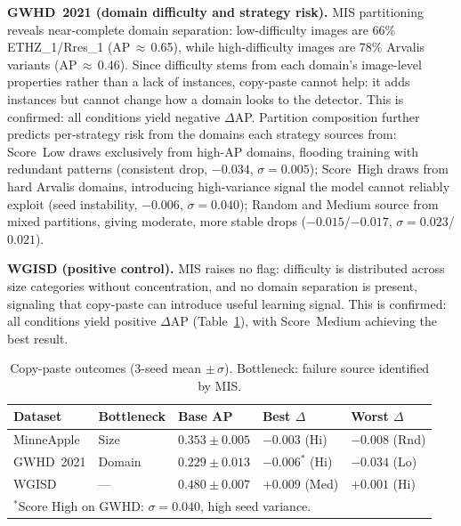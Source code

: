 \documentclass[conference,a4paper]{IEEEtran}
\begin{document}
\textbf{GWHD~2021 (domain difficulty and strategy risk).}
MIS partitioning reveals near-complete domain separation:
low-difficulty images are 66\%  ETHZ\_1/Rres\_1
(AP\,${\approx}$\,0.65), while high-difficulty images are
78\% Arvalis variants (AP\,${\approx}$\,0.46).
Since difficulty stems from each domain's image-level
properties rather than a lack of instances, copy-paste cannot
help: it adds instances but cannot change how a domain looks
to the detector. This is confirmed: all conditions yield
negative $\Delta$AP.
Partition composition further predicts per-strategy risk from
the domains each strategy sources from: Score~Low draws
exclusively from high-AP domains, flooding training with
redundant patterns (consistent drop, $-0.034$,
$\sigma{=}0.005$); Score~High draws from hard Arvalis domains,
introducing high-variance signal the model cannot reliably
exploit (seed instability, $-0.006$, $\sigma{=}0.040$); Random
and Medium source from mixed partitions, giving moderate,
more stable drops ($-0.015$/$-0.017$, $\sigma{=}0.023$/$0.021$).

\textbf{WGISD (positive control).}
MIS raises no flag: difficulty is distributed across size
categories without concentration, and no domain separation is
present, signaling that copy-paste can introduce useful
learning signal. This is confirmed: all conditions yield
positive $\Delta$AP (Table~\ref{tab:outcomes}), with
Score~Medium achieving the best result.

\begin{table}[t]
\centering
\caption{Copy-paste outcomes (3-seed mean $\pm\,\sigma$).
Bottleneck:  failure source identified by MIS.}
\label{tab:outcomes}
\footnotesize
\setlength{\tabcolsep}{2.5pt}
\renewcommand{\arraystretch}{0.95}
\begin{tabular}{lllll}
\toprule
\textbf{Dataset}
  & \textbf{Bottleneck}
  & \textbf{Base AP}
  & \textbf{Best $\Delta$}
  & \textbf{Worst $\Delta$} \\
\midrule
MinneApple
  & Size
  & $0.353\pm0.005$
  & $-0.003$ (Hi)
  & $-0.008$ (Rnd) \\
GWHD~2021
  & Domain
  & $0.229\pm0.013$
  & $-0.006^{*}$ (Hi)
  & $-0.034$ (Lo) \\
WGISD
  & ---
  & $0.480\pm0.007$
  & $+0.009$ (Med)
  & $+0.001$ (Hi) \\
\bottomrule
\multicolumn{5}{l}{\scriptsize
  $^*$Score High on GWHD: $\sigma{=}0.040$, high seed variance.}
\end{tabular}
\end{table}
\end{document}
